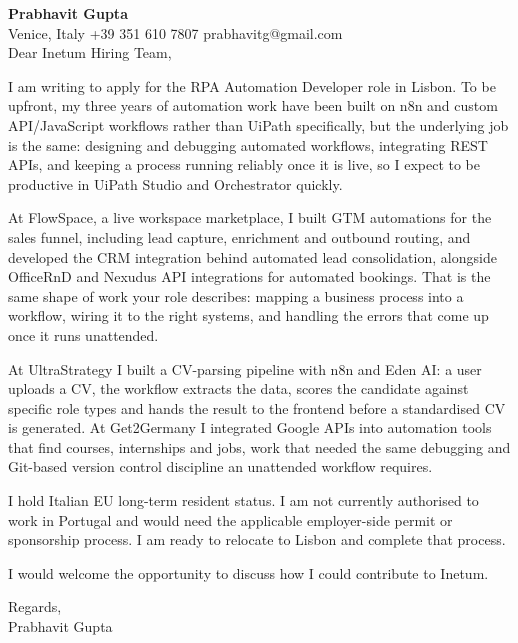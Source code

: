 \documentclass[a4paper,10.5pt]{article}
\begin{document}
\textbf{Prabhavit Gupta}\\
Venice, Italy \textbar{} +39 351 610 7807 \textbar{} prabhavitg@gmail.com\\[10pt]
Dear Inetum Hiring Team,

I am writing to apply for the RPA Automation Developer role in Lisbon. To be upfront, my three years of automation work have been built on n8n and custom API/JavaScript workflows rather than UiPath specifically, but the underlying job is the same: designing and debugging automated workflows, integrating REST APIs, and keeping a process running reliably once it is live, so I expect to be productive in UiPath Studio and Orchestrator quickly.

At FlowSpace, a live workspace marketplace, I built GTM automations for the sales funnel, including lead capture, enrichment and outbound routing, and developed the CRM integration behind automated lead consolidation, alongside OfficeRnD and Nexudus API integrations for automated bookings. That is the same shape of work your role describes: mapping a business process into a workflow, wiring it to the right systems, and handling the errors that come up once it runs unattended.

At UltraStrategy I built a CV-parsing pipeline with n8n and Eden AI: a user uploads a CV, the workflow extracts the data, scores the candidate against specific role types and hands the result to the frontend before a standardised CV is generated. At Get2Germany I integrated Google APIs into automation tools that find courses, internships and jobs, work that needed the same debugging and Git-based version control discipline an unattended workflow requires.

I hold Italian EU long-term resident status. I am not currently authorised to work in Portugal and would need the applicable employer-side permit or sponsorship process. I am ready to relocate to Lisbon and complete that process.

I would welcome the opportunity to discuss how I could contribute to Inetum.

Regards,\\
Prabhavit Gupta
\end{document}

